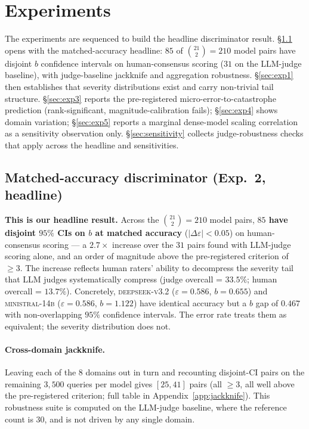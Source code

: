 \documentclass{article}
\newcommand{\sdi}{\ensuremath{b}}
\begin{document}
\section{Experiments}\label{sec:experiments}

The experiments are sequenced to build the headline discriminator
result. \S\ref{sec:exp2} opens with the matched-accuracy headline:
$85$ of $\binom{21}{2} = 210$ model pairs have disjoint \sdi{}
confidence intervals on human-consensus scoring ($31$ on the
LLM-judge baseline), with judge-baseline jackknife and aggregation
robustness. \S\ref{sec:exp1} then establishes that severity
distributions exist and carry non-trivial tail structure.
\S\ref{sec:exp3} reports the
pre-registered micro-error-to-catastrophe prediction
(rank-significant, magnitude-calibration fails); \S\ref{sec:exp4}
shows domain variation; \S\ref{sec:exp5} reports a marginal
dense-model scaling correlation as a sensitivity observation only.
\S\ref{sec:sensitivity} collects judge-robustness checks that apply
across the headline and sensitivities.

\subsection{Matched-accuracy discriminator (Exp.\ 2, headline)}\label{sec:exp2}
\textbf{This is our headline result.} Across the $\binom{21}{2} = 210$
model pairs, \textbf{$85$ have disjoint $95\%$ CIs on $b$ at
matched accuracy} ($|\Delta\varepsilon| < 0.05$) on human-consensus
scoring --- a $2.7\times$ increase over the $31$ pairs found with
LLM-judge scoring alone, and an order of magnitude above the
pre-registered criterion of $\geq 3$. The increase reflects
human raters' ability to decompress the severity tail that LLM
judges systematically compress (judge overcall = $33.5\%$; human
overcall = $13.7\%$). Concretely, \textsc{deepseek-v3.2}
($\varepsilon = 0.586$, $b = 0.655$) and \textsc{ministral-14b}
($\varepsilon = 0.586$, $b = 1.122$) have identical accuracy but a
\sdi{} gap of $0.467$ with non-overlapping $95\%$ confidence
intervals. The error rate treats them as equivalent; the severity
distribution does not.

\paragraph{Cross-domain jackknife.} Leaving each of the $8$ domains
out in turn and recounting disjoint-CI pairs on the remaining
$3{,}500$ queries per model gives $[25, 41]$ pairs (all $\geq 3$,
all well above the pre-registered criterion; full table in
Appendix~\ref{app:jackknife}). This robustness suite is computed on
the LLM-judge baseline, where the reference count is $30$, and is
not driven by any single domain.
\end{document}
